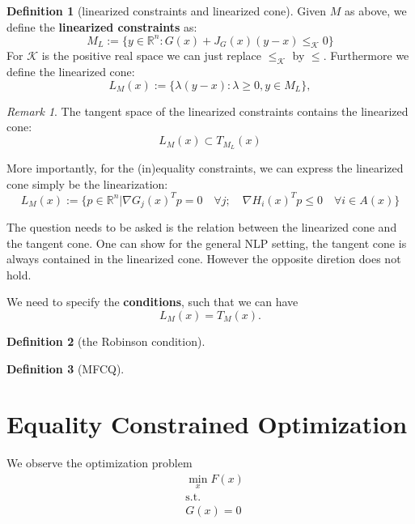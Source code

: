 \documentclass[a4paper,11pt,fleqn, draft]{book}
\theoremstyle{definition}
\newtheorem{definition}{Definition}[section]
\theoremstyle{remark}
\newtheorem*{remark}{Remark}
\newcommand{\Rn}{\mathbb{R}^n}
\newcommand{\ci}{\le_\mathcal{K}}
\begin{document}
\begin{definition}[linearized constraints and linearized cone]
	Given $M$ as above, we define the \textbf{linearized constraints} as: 
	\begin{equation}
		M_L:= \{ y \in \Rn : G(x) + J_G(x) (y - x) \ci 0 \}
	\end{equation}
	For $\mathcal{K}$ is the positive real space we can just replace $\ci$ by $\le$. Furthermore we define the linearized cone:
	\begin{equation}
		L_M(x):= \{ \lambda (y - x) : \lambda \ge 0, y \in M_L \},
	\end{equation}
\end{definition}
\begin{remark}
	The tangent space of the linearized constraints contains the linearized cone:
	\begin{equation*}
		L_M(x) \subset T_{M_L}(x)
	\end{equation*}
\end{remark}
More importantly, for the (in)equality constraints, we can express the linearized cone simply be the linearization:
\begin{equation}
	L_M(x):= \{ p \in \Rn | \nabla G_j(x)^Tp = 0 \quad \forall j ; \quad \nabla H_i(x)^T p \le 0 \quad \forall i \in A(x) \} 
\end{equation}


The question needs to be asked is the relation between the linearized cone and the tangent cone. One can show for the 
general NLP setting, the tangent cone is always contained in the linearized cone. However the opposite diretion does not hold. \par   
We need to specify the \textbf{conditions}, such that we can have
\[
L_M(x) = T_M(x)
.\]

\begin{definition}[the Robinson condition]
\end{definition}

\begin{definition}[MFCQ]
\end{definition}


\section{Equality Constrained Optimization}
We observe the optimization problem
\begin{equation}
	\begin{aligned}
		& \min_x F(x)\\
		&\text{s.t.}\\
		& G(x) = 0
	\end{aligned}\tag{PEQ}\label{eq:PEQ}
\end{equation}
\end{document}
